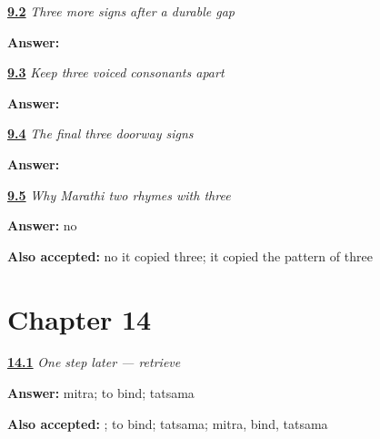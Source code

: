 \noindent\begin{minipage}[t]{\linewidth}
\raggedright
\hyperlink{review-MR-R09-script-b-r3-check}{\textbf{9.2}} \emph{Three more signs after a durable gap}\par
\small \textbf{Answer:}   \par
\end{minipage}\par\medskip

\noindent\begin{minipage}[t]{\linewidth}
\raggedright
\hyperlink{review-MR-R09-script-c-r3-check}{\textbf{9.3}} \emph{Keep three voiced consonants apart}\par
\small \textbf{Answer:}   \par
\end{minipage}\par\medskip

\noindent\begin{minipage}[t]{\linewidth}
\raggedright
\hyperlink{review-MR-R09-script-d-r3-check}{\textbf{9.4}} \emph{The final three doorway signs}\par
\small \textbf{Answer:}   \par
\end{minipage}\par\medskip

\noindent\begin{minipage}[t]{\linewidth}
\raggedright
\hyperlink{review-MR-C06-number-differences-don-ending}{\textbf{9.5}} \emph{Why Marathi \emph{two} rhymes with \emph{three}}\par
\small \textbf{Answer:} no\par
\footnotesize \textbf{Also accepted:} no it copied three; it copied the pattern of three
\end{minipage}\par\medskip

\section*{Chapter 14}

\noindent\begin{minipage}[t]{\linewidth}
\raggedright
\hyperlink{review-MR-R11-mitra-r1-check}{\textbf{14.1}} \emph{One step later — retrieve }\par
\small \textbf{Answer:} mitra; to bind; tatsama\par
\footnotesize \textbf{Also accepted:} ; to bind; tatsama; mitra, bind, tatsama
\end{minipage}\par\medskip

